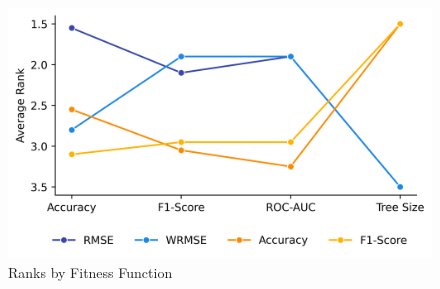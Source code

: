 
    \begin{figure}[H]
    \centering
    \includegraphics[width=\linewidth]{../Latex/Chapters/Figures/Results/RQ_Fitness_ranks.png}
    \caption{Ranks by Fitness Function}
    \label{fig:RQ_Fitness_ranks}
    \end{figure}
    